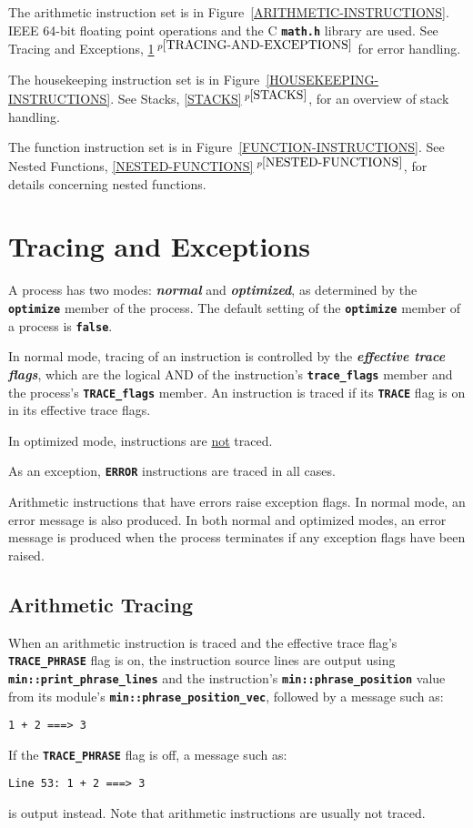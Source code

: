 \documentclass[12pt]{article}
\newcommand{\TT}[1]{{\tt \bfseries #1}}
\newcommand{\key}[1]{{\bf \em #1}\index{#1}}
\newcommand{\itemref}[1]{\ref{#1}$\,^{p\pageref{#1}}$}
\newcommand{\EOL}{\penalty \exhyphenpenalty}
\begin{document}
The arithmetic instruction set is in Figure~\ref{ARITHMETIC-INSTRUCTIONS}.
IEEE 64-bit floating point operations and the C \TT{math.h}
library are used.  See Tracing and Exceptions,
\itemref{TRACING-AND-EXCEPTIONS} for error
handling.

The housekeeping instruction set is in
Figure~\ref{HOUSEKEEPING-INSTRUCTIONS}.
See Stacks, \itemref{STACKS}, for an overview of stack handling.

The function instruction set is in
Figure~\ref{FUNCTION-INSTRUCTIONS}.
See Nested Functions, \itemref{NESTED-FUNCTIONS},
for details concerning nested functions.

\section{Tracing and Exceptions}
\label{TRACING-AND-EXCEPTIONS}

A process has two modes: \key{normal} and \key{optimized}, as
determined by the \TT{optimize} member of the process.
The default setting of the \TT{optimize} member of a process
is \TT{false}.

In normal mode, tracing of an instruction
is controlled by the \key{effective trace flags},
which are the logical AND of the instruction's \TT{trace\_flags}
member and the process's \TT{TRACE\_flags} member.
An instruction is traced if its \TT{TRACE} flag is on
in its effective trace flags.

In optimized mode, instructions are \underline{not} traced.

As an exception, \TT{ERROR} instructions are traced in all cases.

Arithmetic instructions that have errors raise exception flags.
In normal mode, an error message is also produced.  In both
normal and optimized modes, an error message is produced
when the process terminates if any exception flags have been raised.

\subsection{Arithmetic Tracing}
\label{ARITHMETIC-TRACING}

When an arithmetic instruction is traced and the effective
trace flag's \TT{TRACE\_PHRASE} flag is on,
the instruction source lines are output
using \TT{min::\EOL print\_\EOL phrase\_\EOL lines} and the
instruction's \TT{min::\EOL phrase\_\EOL position} value from its module's
\TT{min::phrase\_\EOL position\_\EOL vec}, followed by
a message such as:
\begin{center}
\tt 1 + 2 ===> 3
\end{center}
If the \TT{TRACE\_PHRASE} flag is off, a message such as:
\begin{center}
\tt Line 53: 1 + 2 ===> 3
\end{center}
is output instead.
Note that arithmetic instructions are usually not traced.
\end{document}
